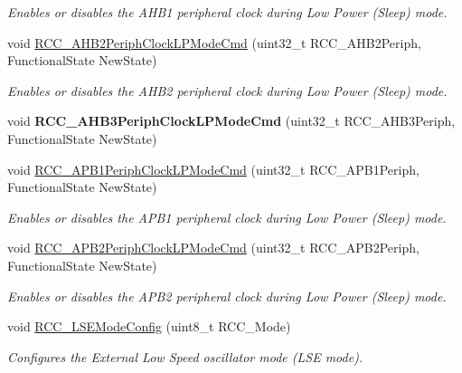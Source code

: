 \begin{DoxyCompactItemize}
\begin{DoxyCompactList}\small\item\em Enables or disables the A\+H\+B1 peripheral clock during Low Power (Sleep) mode. \end{DoxyCompactList}\item 
void \mbox{\hyperlink{group___r_c_c_ga1ac5bb9676ae9b48e50d6a95de922ce3}{R\+C\+C\+\_\+\+A\+H\+B2\+Periph\+Clock\+L\+P\+Mode\+Cmd}} (uint32\+\_\+t R\+C\+C\+\_\+\+A\+H\+B2\+Periph, Functional\+State New\+State)
\begin{DoxyCompactList}\small\item\em Enables or disables the A\+H\+B2 peripheral clock during Low Power (Sleep) mode. \end{DoxyCompactList}\item 
\mbox{\label{group___r_c_c_ga4e1df07cdfd81c068902d9d35fcc3911}} 
void {\bfseries R\+C\+C\+\_\+\+A\+H\+B3\+Periph\+Clock\+L\+P\+Mode\+Cmd} (uint32\+\_\+t R\+C\+C\+\_\+\+A\+H\+B3\+Periph, Functional\+State New\+State)
\item 
void \mbox{\hyperlink{group___r_c_c_ga84dd64badb84768cbcf19e241cadff50}{R\+C\+C\+\_\+\+A\+P\+B1\+Periph\+Clock\+L\+P\+Mode\+Cmd}} (uint32\+\_\+t R\+C\+C\+\_\+\+A\+P\+B1\+Periph, Functional\+State New\+State)
\begin{DoxyCompactList}\small\item\em Enables or disables the A\+P\+B1 peripheral clock during Low Power (Sleep) mode. \end{DoxyCompactList}\item 
void \mbox{\hyperlink{group___r_c_c_ga30365b9e0b4c5d7e98c2675c862ddd7e}{R\+C\+C\+\_\+\+A\+P\+B2\+Periph\+Clock\+L\+P\+Mode\+Cmd}} (uint32\+\_\+t R\+C\+C\+\_\+\+A\+P\+B2\+Periph, Functional\+State New\+State)
\begin{DoxyCompactList}\small\item\em Enables or disables the A\+P\+B2 peripheral clock during Low Power (Sleep) mode. \end{DoxyCompactList}\item 
void \mbox{\hyperlink{group___r_c_c_gad62e35e5a3289624e00636ff483e5399}{R\+C\+C\+\_\+\+L\+S\+E\+Mode\+Config}} (uint8\+\_\+t R\+C\+C\+\_\+\+Mode)
\begin{DoxyCompactList}\small\item\em Configures the External Low Speed oscillator mode (L\+SE mode). \end{DoxyCompactList}\item 

\end{DoxyCompactItemize}
